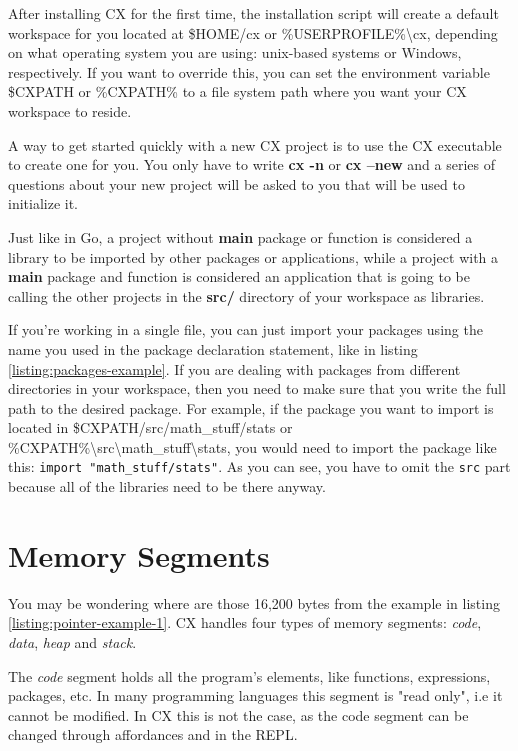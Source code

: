 \documentclass[11pt,fleqn,openany]{book} %
\begin{document}
After installing CX for the first time, the installation script will create a default workspace for you located at \$HOME/cx or \%USERPROFILE\%\textbackslash cx, depending on what operating system you are using: unix-based systems or Windows, respectively. If you want to override this, you can set the environment variable \$CXPATH or \%CXPATH\% to a file system path where you want your CX workspace to reside.

A way to get started quickly with a new CX project is to use the CX executable to create one for you. You only have to write \textbf{cx -n} or \textbf{cx --new} and a series of questions about your new project will be asked to you that will be used to initialize it.

Just like in Go, a project without \textbf{main} package or function is considered a library to be imported by other packages or applications, while a project with a \textbf{main} package and function is considered an application that is going to be calling the other projects in the \textbf{src/} directory of your workspace as libraries.

If you're working in a single file, you can just import your packages using the name you used in the package declaration statement, like in listing \ref{listing:packages-example}. If you are dealing with packages from different directories in your workspace, then you need to make sure that you write the full path to the desired package. For example, if the package you want to import is located in \$CXPATH/src/math\_stuff/stats or \%CXPATH\%\textbackslash src\textbackslash math\_stuff\textbackslash stats, you would need to import the package like this: \lstinline{import "math_stuff/stats"}. As you can see, you have to omit the \lstinline{src} part because all of the libraries need to be there anyway.

\section{Memory Segments}
\label{section:memory-segments}

You may be wondering where are those 16,200 bytes from the example in listing \ref{listing:pointer-example-1}. CX handles four types of memory segments: \emph{code}, \emph{data}, \emph{heap} and \emph{stack}.

The \emph{code} segment holds all the program's elements, like functions, expressions, packages, etc. In many programming languages this segment is "read only", i.e it cannot be modified. In CX this is not the case, as the code segment can be changed through affordances and in the REPL.
\end{document}
